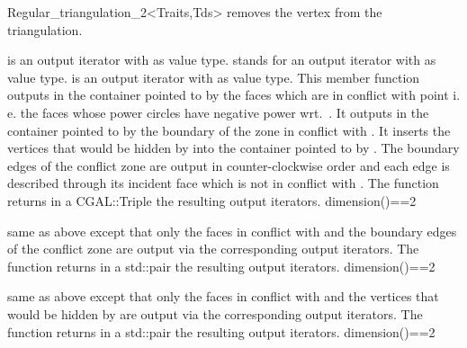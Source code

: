 \begin{ccRefClass}{Regular_triangulation_2<Traits,Tds>}
{removes the vertex from the triangulation.}


 {
   is an output iterator with  as
  value type.   stands for an output
  iterator with  as value type.
   is an output iterator with
   as value type.  This member function outputs in
  the container pointed to by  the faces which are in
  conflict with point  i. e. the faces whose power circles
  have negative power wrt.\ .  It outputs in the container
  pointed to by  the boundary of the zone in conflict
  with .  It inserts the vertices that would be hidden by  
  into the container pointed to by .  The boundary edges of
  the conflict zone are output in counter-clockwise order and each edge
  is described through its incident face which is not in conflict with
  .  The function returns in a CGAL::Triple the resulting output
  iterators.
  \ccPrecond dimension()==2}

{
  same as above except that only the faces in conflict with  and 
  the boundary edges of the conflict zone 
  are output via the corresponding output iterators. The function returns 
  in a std::pair the resulting output iterators.
  \ccPrecond dimension()==2}

{
  same as above except that only the faces in conflict with  and 
  the vertices that would be hidden by 
  are output via the corresponding output iterators. The function returns 
  in a std::pair the resulting output iterators.
  \ccPrecond dimension()==2}


\end{ccRefClass}
